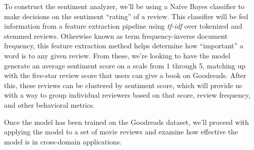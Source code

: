 To construct the sentiment analyzer, we'll be using a Na\"ive Bayes classifier to make decisions on
the sentiment ``rating'' of a review. This classifier will be fed information
from a feature extraction pipeline using \textit{tf-idf} over tokenized and stemmed
reviews. Otherwise known as term frequency-inverse document frequency, this feature
extraction method helps determine how ``important'' a word is to any given review. From these, we're looking to have the model generate an average sentiment
score on a scale from 1 through 5, matching up with the five-star review score that
users can give a book on Goodreads. After this, these reviews can be clustered by
sentiment score, which will provide us with a way to group individual reviewers based on that score, review frequency, and other behavioral metrics.

Once the model has been trained on the Goodreads dataset, we'll proceed with applying
the model to a set of movie reviews and examine how effective the model is in
cross-domain applications.